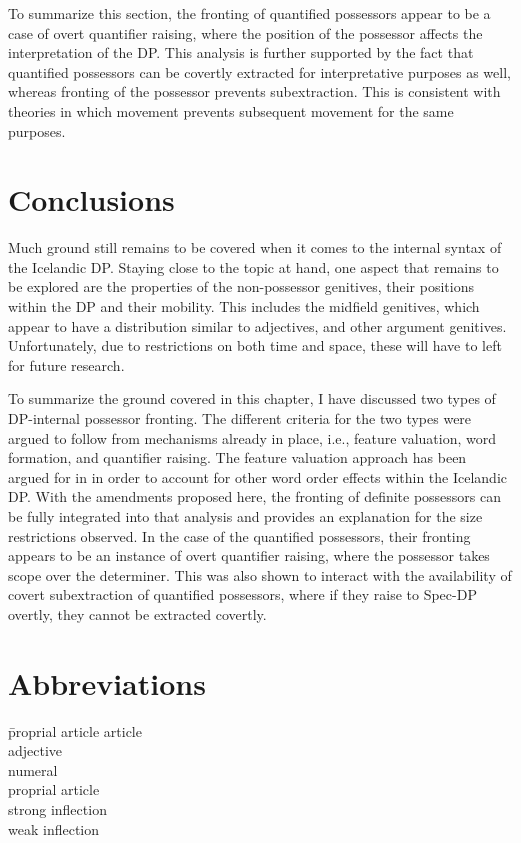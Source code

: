 \documentclass[output=paper,colorlinks,citecolor=brown,
]{langscibook}
\begin{document}
To summarize this section, the fronting of quantified possessors appear to be a case of overt quantifier raising, where the position of the possessor affects the interpretation of the DP. This analysis is further supported by the fact that quantified possessors can be covertly extracted for interpretative purposes as well, whereas fronting of the possessor prevents subextraction. This is consistent with theories in which movement prevents subsequent movement for the same purposes.




\section{Conclusions}

Much ground still remains to be covered when it comes to the internal syntax of the Icelandic DP. Staying close to the topic at hand, one aspect that remains to be explored are the properties of the non-possessor genitives, their positions within the DP and their mobility. This includes the midfield genitives, which appear to have a distribution similar to adjectives, and other argument genitives. Unfortunately, due to restrictions on both time and space, these will have to left for future research.

To summarize the ground covered in this chapter, I have discussed two types of DP-internal possessor fronting. The different criteria for the two types were argued to follow from mechanisms already in place, i.e., feature valuation, word formation, and quantifier raising. The feature valuation approach has been argued for in \citet{Hardarson:2016wd} in order to account for other word order effects within the Icelandic DP. With the amendments proposed here, the fronting of definite possessors can be fully integrated into that analysis and provides an explanation for the size restrictions observed. In the case of the quantified possessors, their fronting appears to be an instance of overt quantifier raising, where the possessor takes scope over the determiner. This was also shown to interact with the availability of covert subextraction of quantified possessors, where if they raise to Spec-DP overtly, they cannot be extracted covertly.




\section*{Abbreviations}
\begin{multicols}{3}
\begin{tabbing}
\hardProp\hspace{1ex}\= proprial article \kill
\hardArt \> article \\
\hardAdj \> adjective \\
\hardNum \> numeral   \\
\hardProp \> proprial article \\
\hardStr \> strong inflection \\
\hardWk \> weak inflection
\end{tabbing}
\end{multicols}
\end{document}
